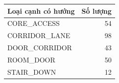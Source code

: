 \begin{center}\small
\begin{tabular}{lr}
\toprule
Loại cạnh có hướng & Số lượng\\\midrule
CORE\_ACCESS & 54\\
CORRIDOR\_LANE & 98\\
DOOR\_CORRIDOR & 43\\
ROOM\_DOOR & 50\\
STAIR\_DOWN & 12\\
\bottomrule\end{tabular}\end{center}